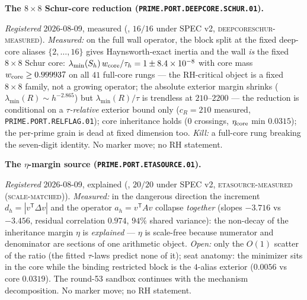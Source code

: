 \par\smallskip\noindent\textbf{The $8\times8$ Schur-core
reduction (\texttt{PRIME.PORT.DEEPCORE.\allowbreak SCHUR.01}).}
{\sloppy
\emph{Registered} 2026-08-09, measured
(, $16/16$ under SPEC v2,
\textsc{deepcoreschur-measured}).  \emph{Measured:} on the
full wall operator, the block split at the fixed deep-core
aliases $\{2, \dots, 16\}$ gives Haynsworth-exact inertia and
the wall \emph{is} the fixed $8\times8$ Schur core:
$\lambda_{\min}(S_h)\,w_{\rm core}/\tau_h = 1 \pm
8.4\times10^{-8}$ with core mass $w_{\rm core} \ge 0.999937$
on all $41$ full-core rungs --- the RH-critical object is a
fixed $8\times8$ family, not a growing operator; the absolute
exterior margin shrinks ($\lambda_{\min}(R) \sim h^{-2.865}$)
but $\lambda_{\min}(R)/\tau$ is trendless at $210$--$2200$ ---
the reduction is conditional on a \emph{$\tau$-relative}
exterior bound only ($c_R = 210$ measured,
\texttt{PRIME.PORT.RELFLAG.01}); core inheritance holds ($0$
crossings, $\eta_{\rm core}$ min $0.0315$); the per-prime
grain is dead at fixed dimension too.  \emph{Kill:} a
full-core rung breaking the seven-digit identity.  No marker
move; no RH statement.\par}


\par\smallskip\noindent\textbf{The $\eta$-margin source
(\texttt{PRIME.PORT.\allowbreak ETASOURCE.01}).}
{\sloppy
\emph{Registered} 2026-08-09, explained
(, $20/20$ under SPEC v2,
\textsc{etasource-measured (scale-matched)}).
\emph{Measured:} in the dangerous direction the increment
$d_h = |v^{\mathsf T}\Delta v|$ and the operator $a_h =
v^{\mathsf T}Av$ collapse \emph{together} (slopes $-3.716$ vs
$-3.456$, residual correlation $0.974$, $94\%$ shared
variance): the non-decay of the inheritance margin $\eta$ is
\emph{explained} --- $\eta$ is scale-free because numerator
and denominator are sections of one arithmetic object.
\emph{Open:} only the $O(1)$ scatter of the ratio (the fitted
$\tau$-laws predict none of it); seat anatomy: the minimizer
sits in the core while the binding restricted block is the
$4$-alias exterior ($0.0056$ vs core $0.0319$).  The round-53
sandbox continues with the mechanism decomposition.  No marker
move; no RH statement.\par}


